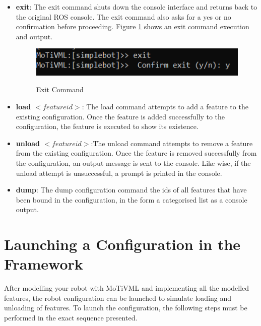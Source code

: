 \documentclass{article}
\begin{document}
\begin{itemize}
	\item \textbf{exit}: The exit command shuts down the console interface and returns back to the original ROS console. The exit command also asks for a yes or no confirmation before proceeding. Figure \ref{exit} shows an exit command execution and output.
	\begin{figure}[H]
		\caption{Exit Command}
		\centering
		\includegraphics[width=\columnwidth]{images/exit.png}
		\label{exit}
	\end{figure}

	\item \textbf{load $<feature id>$}: The load command attempts to add a feature to the existing configuration. Once the feature is added successfully to the configuration, the feature is executed to show its existence.
	
	\item \textbf{unload $<feature id>$}:The unload command attempts to remove a feature from the existing configuration. Once the feature is removed successfully from the configuration, an output message is sent to the console. Like wise, if the unload attempt is unsuccessful, a prompt is printed in the console. 
	
	\item \textbf{dump}: The dump configuration command the ids of all features that have been bound in the configuration, in the form a categorised list as a console output.
\end{itemize}

\section{Launching a Configuration in the Framework}
After modelling your robot with MoTiVML and implementing all the modelled features, the robot configuration can be launched to simulate loading and unloading of features. To launch the configuration, the following steps must be performed in the exact sequence presented. 
\end{document}
